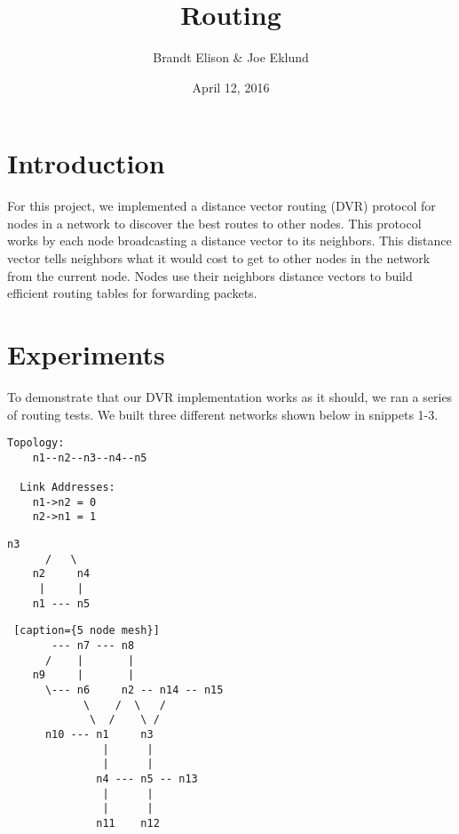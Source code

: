 \documentclass[11pt]{article}
\begin{document}
\lstset{
  language=Python,
  basicstyle=\small,          %
  keywordstyle=\bfseries,
  identifierstyle=,           %
  commentstyle=,              %
  stringstyle=\ttfamily,      %
  showstringspaces=false,     %
  numbers=left,
  numberstyle=\tiny,
  numbersep=5pt,
  frame=tb
}

\title{Routing}

\author{Brandt Elison & Joe Eklund}

\date{April 12, 2016}

\maketitle

\section{Introduction}

For this project, we implemented a distance vector routing (DVR) protocol for nodes in a network to discover the best routes to other nodes. This protocol works by each node broadcasting a distance vector to its neighbors. This distance vector tells neighbors what it would cost to get to other nodes in the network from the current node. Nodes use their neighbors distance vectors to build efficient routing tables for forwarding packets.

\section{Experiments}

To demonstrate that our DVR implementation works as it should, we ran a series of routing tests. We built three different networks shown below in snippets 1-3.

\begin{lstlisting}[caption={5 nodes in a line}]
  Topology:
    n1--n2--n3--n4--n5

  Link Addresses:
    n1->n2 = 0
    n2->n1 = 1
\end{lstlisting}

\begin{lstlisting}[caption={5 nodes in a ring}]
        n3 
      /   \
    n2     n4
     |     |
    n1 --- n5
\end{lstlisting}

\begin{lstlisting} [caption={5 node mesh}]
       --- n7 --- n8
      /    |       |
    n9     |       |
      \--- n6     n2 -- n14 -- n15
            \    /  \   /
             \  /    \ /
      n10 --- n1     n3
               |      |
               |      |
              n4 --- n5 -- n13
               |      |
               |      |
              n11    n12
\end{lstlisting}
\end{document}
